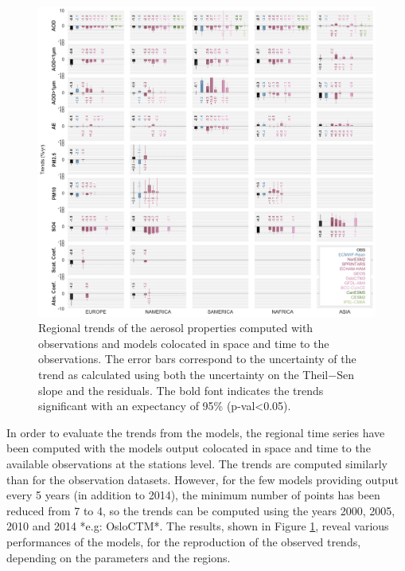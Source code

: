 \documentclass[journal abbreviation, manuscript]{copernicus}
\begin{document}
\begin{figure}[t]
 \includegraphics[width=16cm]{../scripts/figs/heatmaps/BARS.png}
 \caption{Regional trends of the aerosol properties computed with observations and models colocated in space and time to the observations. The error bars correspond to the uncertainty of the trend as calculated using both the uncertainty on the Theil−Sen slope and the residuals. The bold font indicates the trends significant with an expectancy of 95\% (p-val<0.05).}
 \label{fig:bars}
\end{figure}

In order to evaluate the trends from the models, the regional time series have been computed with the models output colocated in space and time to the available observations at the stations level. The trends are computed similarly than for the observation datasets. However, for the few models providing output every 5 years (in addition to 2014), the minimum number of points has been reduced from 7 to 4, so the trends can be computed using the years 2000, 2005, 2010 and 2014 *e.g: OsloCTM*. The results, shown in Figure \ref{fig:bars}, reveal various performances of the models, for the reproduction of the observed trends, depending on the parameters and the regions.
\end{document}
